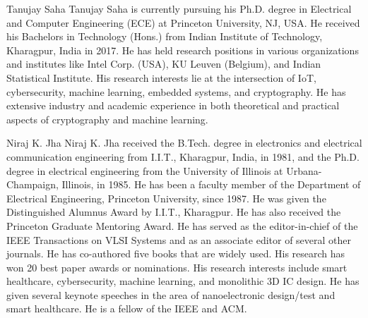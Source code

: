 \documentclass[10pt,journal,compsoc]{IEEEtran}
\begin{document}
\begin{IEEEbiography}{Tanujay Saha}
Tanujay Saha is currently pursuing his Ph.D. degree in Electrical and Computer Engineering (ECE) at Princeton University, 
NJ, USA. He received his Bachelors in Technology (Hons.) from Indian Institute of Technology, 
Kharagpur, India in 2017. He has held research positions in various 
organizations and institutes like Intel Corp. (USA), KU Leuven (Belgium), and Indian 
Statistical Institute. His research interests lie at the intersection of 
IoT, cybersecurity, machine learning, embedded systems, and cryptography. He 
has extensive industry and academic experience in both theoretical and practical 
aspects of cryptography and machine learning.
\end{IEEEbiography}


\begin{IEEEbiography}{Niraj K. Jha}
Niraj K. Jha received the B.Tech. degree in electronics and electrical
communication engineering from I.I.T., Kharagpur, India, in 1981, and the
Ph.D. degree in electrical engineering from the University of Illinois at
Urbana-Champaign, Illinois, in 1985. He has been a faculty member of the
Department of Electrical Engineering, Princeton University, since 1987.
He was given the Distinguished Alumnus Award by I.I.T., Kharagpur. He
has also received the Princeton Graduate Mentoring Award. He has served
as the editor-in-chief of the IEEE Transactions on VLSI Systems and as
an associate editor of several other journals. He has co-authored five
books that are widely used. His research has won 20 best paper awards or
nominations. His research interests include smart healthcare,
cybersecurity, machine learning, and monolithic 3D IC design. He has
given several keynote speeches in the area of nanoelectronic design/test
and smart healthcare. He is a fellow of the IEEE and ACM.
\end{IEEEbiography}



\end{document}
